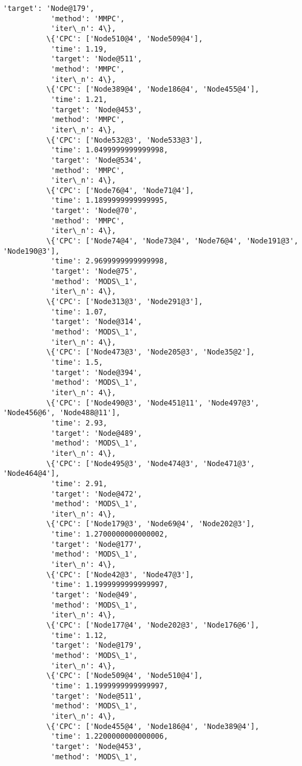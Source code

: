 \documentclass[11pt]{article}
\begin{document}
\begin{Verbatim}[commandchars=\\\{\}]
           'target': 'Node@179',
           'method': 'MMPC',
           'iter\_n': 4\},
          \{'CPC': ['Node510@4', 'Node509@4'],
           'time': 1.19,
           'target': 'Node@511',
           'method': 'MMPC',
           'iter\_n': 4\},
          \{'CPC': ['Node389@4', 'Node186@4', 'Node455@4'],
           'time': 1.21,
           'target': 'Node@453',
           'method': 'MMPC',
           'iter\_n': 4\},
          \{'CPC': ['Node532@3', 'Node533@3'],
           'time': 1.0499999999999998,
           'target': 'Node@534',
           'method': 'MMPC',
           'iter\_n': 4\},
          \{'CPC': ['Node76@4', 'Node71@4'],
           'time': 1.1899999999999995,
           'target': 'Node@70',
           'method': 'MMPC',
           'iter\_n': 4\},
          \{'CPC': ['Node74@4', 'Node73@4', 'Node76@4', 'Node191@3', 'Node190@3'],
           'time': 2.9699999999999998,
           'target': 'Node@75',
           'method': 'MODS\_1',
           'iter\_n': 4\},
          \{'CPC': ['Node313@3', 'Node291@3'],
           'time': 1.07,
           'target': 'Node@314',
           'method': 'MODS\_1',
           'iter\_n': 4\},
          \{'CPC': ['Node473@3', 'Node205@3', 'Node35@2'],
           'time': 1.5,
           'target': 'Node@394',
           'method': 'MODS\_1',
           'iter\_n': 4\},
          \{'CPC': ['Node490@3', 'Node451@11', 'Node497@3', 'Node456@6', 'Node488@11'],
           'time': 2.93,
           'target': 'Node@489',
           'method': 'MODS\_1',
           'iter\_n': 4\},
          \{'CPC': ['Node495@3', 'Node474@3', 'Node471@3', 'Node464@4'],
           'time': 2.91,
           'target': 'Node@472',
           'method': 'MODS\_1',
           'iter\_n': 4\},
          \{'CPC': ['Node179@3', 'Node69@4', 'Node202@3'],
           'time': 1.2700000000000002,
           'target': 'Node@177',
           'method': 'MODS\_1',
           'iter\_n': 4\},
          \{'CPC': ['Node42@3', 'Node47@3'],
           'time': 1.1999999999999997,
           'target': 'Node@49',
           'method': 'MODS\_1',
           'iter\_n': 4\},
          \{'CPC': ['Node177@4', 'Node202@3', 'Node176@6'],
           'time': 1.12,
           'target': 'Node@179',
           'method': 'MODS\_1',
           'iter\_n': 4\},
          \{'CPC': ['Node509@4', 'Node510@4'],
           'time': 1.1999999999999997,
           'target': 'Node@511',
           'method': 'MODS\_1',
           'iter\_n': 4\},
          \{'CPC': ['Node455@4', 'Node186@4', 'Node389@4'],
           'time': 1.2200000000000006,
           'target': 'Node@453',
           'method': 'MODS\_1',

\end{Verbatim}
\end{document}
